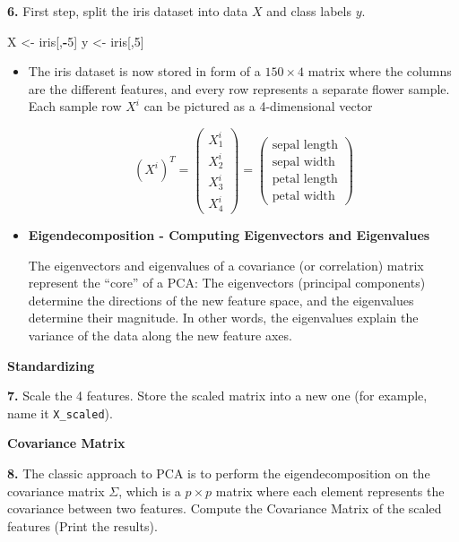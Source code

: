 \documentclass[]{book}
\newenvironment{Shaded}{\begin{snugshade}}{\end{snugshade}}
\newcommand{\DecValTok}[1]{\textcolor[rgb]{0.00,0.00,0.81}{#1}}
\newcommand{\StringTok}[1]{\textcolor[rgb]{0.31,0.60,0.02}{#1}}
\newcommand{\OperatorTok}[1]{\textcolor[rgb]{0.81,0.36,0.00}{\textbf{#1}}}
\newcommand{\NormalTok}[1]{#1}
\newenvironment{rmdblock}[1]
  {\begin{shaded*}
  \begin{itemize}
  \renewcommand{\labelitemi}{
    \raisebox{-.7\height}[0pt][0pt]{
      {\setkeys{Gin}{width=2em,keepaspectratio}\texttt{[image: img/icons/\#1]}}
    }
  }
  \item
  }
  {
  \end{itemize}
  \end{shaded*}
  }
\newenvironment{rmdinsight}
  {\begin{rmdblock}{insight}}
  {\end{rmdblock}}
\theoremstyle{definition}
\theoremstyle{definition}
\theoremstyle{definition}
\theoremstyle{remark}
\begin{document}
\textbf{6.} First step, split the iris dataset into data \(X\) and class
labels \(y\).

\begin{Shaded}
\begin{Highlighting}[]
\NormalTok{X <-}\StringTok{ }\NormalTok{iris[,}\OperatorTok{-}\DecValTok{5}\NormalTok{]}
\NormalTok{y <-}\StringTok{ }\NormalTok{iris[,}\DecValTok{5}\NormalTok{]}
\end{Highlighting}
\end{Shaded}

\begin{rmdinsight}
The iris dataset is now stored in form of a \(150 \times 4\) matrix
where the columns are the different features, and every row represents a
separate flower sample. Each sample row \(X^i\) can be pictured as a
4-dimensional vector

\[ (X^i)^T = \begin{pmatrix} X_1^i \\ X_2^i \\ X_3^i \\ X_4^i \end{pmatrix}
= \begin{pmatrix} \text{sepal length} \\ \text{sepal width} \\\text{petal length} \\ \text{petal width} \end{pmatrix}\]
\end{rmdinsight}

\begin{rmdinsight}
\textbf{Eigendecomposition - Computing Eigenvectors and Eigenvalues}

The eigenvectors and eigenvalues of a covariance (or correlation) matrix
represent the ``core'' of a PCA: The eigenvectors (principal components)
determine the directions of the new feature space, and the eigenvalues
determine their magnitude. In other words, the eigenvalues explain the
variance of the data along the new feature axes.
\end{rmdinsight}

\textbf{Standardizing}

\textbf{7.} Scale the 4 features. Store the scaled matrix into a new one
(for example, name it \texttt{X\_scaled}).

\textbf{Covariance Matrix}

\textbf{8.} The classic approach to PCA is to perform the
eigendecomposition on the covariance matrix \(\Sigma\), which is a
\(p\times p\) matrix where each element represents the covariance
between two features. Compute the Covariance Matrix of the scaled
features (Print the results).
\end{document}
